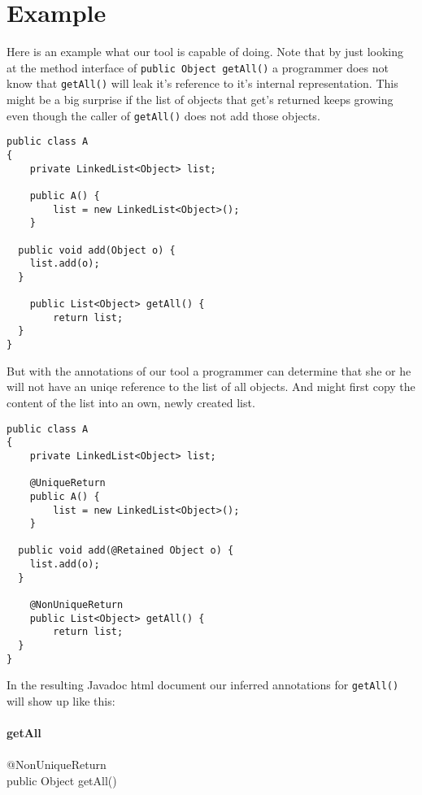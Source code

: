 \section{Example}
\label{sec:Example}

Here is an example what our tool is capable of doing.
Note that by just looking at the method interface of 
\texttt{public Object getAll()} a programmer does not know
that \texttt{getAll()} will leak it's reference to it's
internal representation. This might be a big surprise
if the list of objects that get's returned keeps growing
even though the caller of \texttt{getAll()} does not add those objects.


\begin{lstlisting}
public class A
{
	private LinkedList<Object> list;
		
	public A() {
		list = new LinkedList<Object>();
	}
		
  public void add(Object o) {
   	list.add(o);
  }
    
	public List<Object> getAll() {
		return list;
  }
}
\end{lstlisting}

But with the annotations of our tool a programmer can 
determine that she or he will not have an uniqe reference
to the list of all objects. And might first copy the content 
of the list into an own, newly created list.

\begin{lstlisting}
public class A
{
	private LinkedList<Object> list;
	
	@UniqueReturn
	public A() {
		list = new LinkedList<Object>();
	}
		
  public void add(@Retained Object o) {
   	list.add(o);
  }
  
	@NonUniqueReturn
	public List<Object> getAll() {
		return list;
  }
}
\end{lstlisting}

In the resulting Javadoc html document our inferred annotations
for \texttt{getAll()} will show up like this:\\
\\
{\bf getAll}\\
\\
@NonUniqueReturn\\
public Object getAll()\\